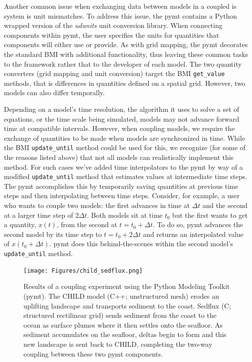 \documentclass{article} %
\begin{document}
Another common issue when exchanging data between
models in a coupled is system is unit mismatches. To address this issue, the pymt contains a Python
wrapped version of the \textit{udunits} unit conversion library.
When connecting components within pymt, the user specifies
the units for quantities that components will either use or
provide. As with grid mapping, the pymt decorates the standard
BMI with additional functionality, thus leaving these common
tasks to the framework rather that to the developer of each model. 
The two quantity converters (grid mapping and
unit conversion) target the BMI \texttt{get\_value} methods, that is
differences in quantities defined on a spatial grid. However,
two models can also differ temporally.

Depending on a model's time resolution, the algorithm it uses
to solve a set of equations, or the time scale being simulated,
models may not advance forward time at compatible intervals.
However, when coupling models, we require the exchange of quantities
to be made when models are synchronized in time.  While the BMI
\texttt{update\_until} method could be used for this, we recognize
(for some of the reasons listed above) that not all models
can realistically implement this method. For such cases we've
added time interpolators to the pymt by way of a modified
\texttt{update\_until} method that estimates values at intermediate time
steps. The pymt accomplishes this by temporarily saving quantities
at previous time steps and then interpolating between time steps.
Consider, for example, a user who wants to couple two models:
the first advances in time at $\Delta t$ and the second
at a larger time step of $2 \Delta t$. Both models sit at time $t_0$ but the first
wants to get a quantity, $x(t)$, from the second at $t = t_0 + \Delta t$.
To do so, pymt advances the second model by its time step to $t = t_0 + 2 \Delta t$
and returns an interpolated value of $x(t_0 + \Delta t)$.
pymt does this behind-the-scenes within the second model's
\texttt{update\_until} method.

\begin{figure}[h!]
\centering
\texttt{[image: Figures/child\_sedflux.png]}
\caption{Results of a coupling experiment using the Python Modeling Toolkit (pymt).
The CHILD model (C++; unstructured mesh) erodes an uplifting landscape and
transports sediment to the coast. Sedflux (C; structured rectilinear grid)
sends sediment from the coast to the ocean as surface plumes
where it then settles onto the seafloor. As sediment accumulates on the seafloor,
deltas begin to form and this new landscape is sent back to CHILD, completing the two-way coupling
between these two pymt components.}
\label{fig:child_sedflux}
\end{figure}
\end{document}
